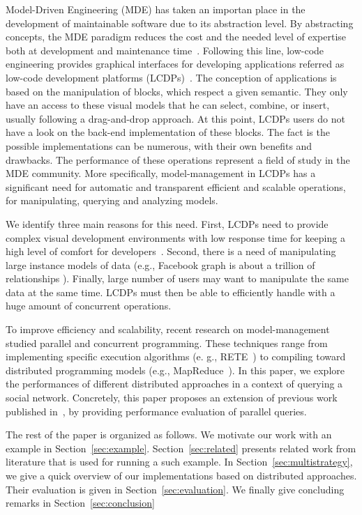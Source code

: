 \begin{multicols}{2}
Model-Driven  Engineering  (MDE)  has  taken  an  importan place in the development of
maintainable software due to its abstraction level. By abstracting concepts, the MDE
paradigm reduces the cost and the needed level of expertise both at development and
maintenance time~\cite{KarnaTK2009:OOPSLA}. Following this line, low-code engineering
provides graphical interfaces for developing applications referred as low-code
development platforms (LCDPs)~\cite{TisiMKDMDP2019:STAF}. The conception of applications
is based on the manipulation of blocks, which respect a given semantic. They only
have an access to these visual models that he can select, combine, or insert, usually
following a drag-and-drop approach. At this point, LCDPs users do not have a look on
the back-end implementation of these blocks. The fact is the possible implementations
can be numerous, with their own benefits and drawbacks. The performance of these
operations represent a field of study in the MDE community. More specifically,
model-management in LCDPs has a significant need for automatic and transparent efficient
and scalable operations, for manipulating, querying and analyzing models.

We identify three main reasons for this need. First, LCDPs need to provide complex visual
development environments with low response time for keeping a high level of comfort for 
developers~\cite{MartinezTD2017:SCP}. Second, there is a need of manipulating large instance 
models of data (e.g., Facebook graph is about a trillion of relationships
\cite{ChingEKLM2015:OTE}). Finally, large number of users may want to manipulate the same 
data at the same time. LCDPs must then be able to efficiently handle with a huge amount of 
concurrent operations.

To improve efficiency and scalability, recent research on model-management studied parallel
and concurrent programming. These techniques range from implementing specific execution
algorithms (e. g., RETE~\cite{Forgy1982:AI}) to compiling toward distributed programming
models (e.g., MapReduce~\cite{DeanG2004:OSDI}). In this paper, we explore the performances
of different distributed approaches in a context of querying a social network. Concretely,
this paper proposes an extension of previous work published in~\cite{PhilippeCTS2020:MODELS},
by providing performance evaluation of parallel queries.

The rest of the paper is organized as follows. We motivate our work with an example in
Section~\ref{sec:example}. Section~\ref{sec:related} presents related work from literature
that is used for running a such example. In Section~\ref{sec:multistrategy}, we give a quick
overview of our implementations based on distributed approaches. Their evaluation is given in
Section~\ref{sec:evaluation}. We finally give concluding remarks in Section~\ref{sec:conclusion}
\end{multicols}

